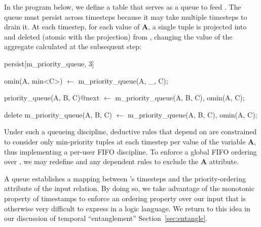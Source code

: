 
In the program below, we define a table  that
serves as a queue to feed .  The queue must persist
across timesteps because it may take multiple timesteps to drain it.  At each
timestep, for each value of \textbf{A}, a single tuple is projected into
 and deleted (atomic with the projection) from
, changing the value of the aggregate calculated
at the subsequent step:

\begin{Dedalus}
persist[m\_priority\_queue, 3]

omin(A, min<C>) \(\leftarrow\)
  m\_priority\_queue(A, _, C);

priority_queue(A, B, C)@next \(\leftarrow\)
  m\_priority\_queue(A, B, C), omin(A, C);

delete m\_priority\_queue(A, B, C) \(\leftarrow\)
  m\_priority\_queue(A, B, C), omin(A, C);
\end{Dedalus}

Under such a queueing discipline, deductive rules that depend on
 are constrained to consider only min-priority tuples at each timestep
per value of the variable \textbf{A}, thus implementing a per-user  FIFO
discipline.  To enforce a global FIFO ordering over , we
may redefine  and any dependent rules to exclude the \textbf{A}
attribute.

A queue establishes a mapping between \lang's timesteps
and the priority-ordering attribute of the input relation. By doing so, we take advantage of the monotonic property of timestamps to enforce an ordering property over our input that is otherwise 
very difficult to express in a logic language.  
We return to this idea in our discussion of temporal ``entanglement'' Section~\ref{sec:entangle}.  

